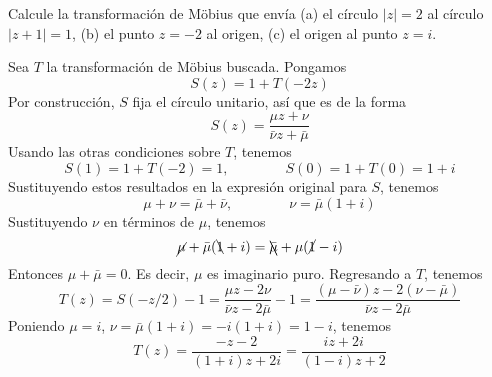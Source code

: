 \begin{exercise}
Calcule la transformación de Möbius que envía (a) el círculo $|z| = 2$ al círculo $|z+1| = 1$, (b) el punto $z = -2$ al origen, (c) el origen al punto $z = i$.
\end{exercise}

\begin{solution}
Sea $T$ la transformación de Möbius buscada. Pongamos
$$S(z) = 1 + T(-2z)$$
Por construcción, $S$ fija el círculo unitario, así que es de la forma
$$S(z) = \frac {\mu z + \nu} {\bar \nu z + \bar \mu}$$
Usando las otras condiciones sobre $T$, tenemos
$$S(1) = 1 + T(-2) = 1, \qquad \qquad S(0) = 1 + T(0) = 1 + i$$
Sustituyendo estos resultados en la expresión original para $S$, tenemos
$$\mu + \nu = \bar \mu + \bar \nu, \qquad \qquad \nu = \bar \mu (1 + i)$$
Sustituyendo $\nu$ en términos de $\mu$, tenemos
$$\cancel \mu + \bar \mu ( \bcancel 1 + i ) = \bcancel {\bar \mu} + \mu ( \cancel 1 - i )$$
Entonces $\mu + \bar \mu = 0$. Es decir, $\mu$ es imaginario puro. Regresando a $T$, tenemos
$$
T(z)
    = S(-z/2) - 1
    = \frac {\mu z - 2 \nu} {\bar \nu z - 2 \bar \mu} - 1
    = \frac {(\mu - \bar \nu) z - 2 (\nu - \bar \mu)} {\bar \nu z - 2 \bar \mu}
$$
Poniendo $\mu = i$, $\nu = \bar \mu (1 + i) = -i (1 + i) = 1 - i$, tenemos
$$T(z) = \frac {-z - 2} {(1 + i)z + 2i} = \frac {iz + 2i} {(1 - i) z + 2}$$
\end{solution}

